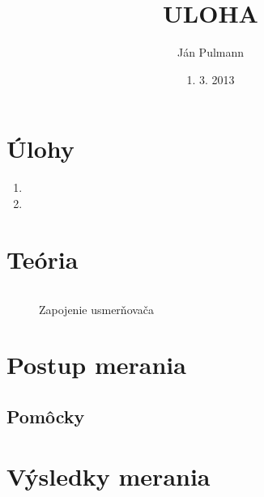 \documentclass[a4paper, 10pt]{article}
\begin{document}
\title{ULOHA}
\author{Ján Pulmann}
\date{1. 3. 2013}
\maketitle
\section*{Úlohy}
\begin{enumerate}

	\item 
	\item 

 \end{enumerate}
 
\section*{Teória}

\begin{equation}
\label{eq:}
\end{equation}


\begin{figure}[htb]
\centering
\caption{Zapojenie usmerňovača}
\label{fig:zap1}
\end{figure}

\section*{Postup merania}

\subsection*{Pomôcky}

\section*{Výsledky merania}
\end{document}
